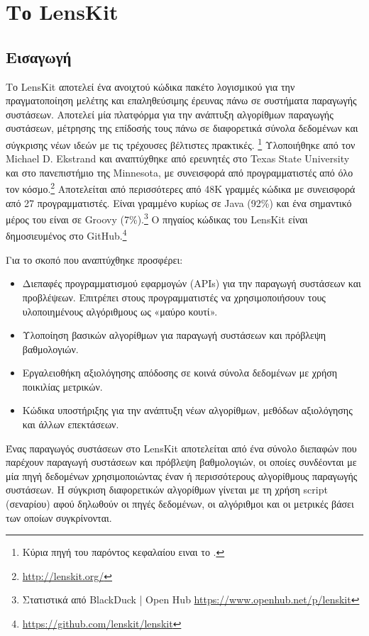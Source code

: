 \chapter{Το {\en LensKit}}
\label{Chapter4}

\section{Εισαγωγή}

Το {\en LensKit} αποτελεί ένα ανοιχτού κώδικα πακέτο λογισμικού για την πραγματοποίηση μελέτης και επαληθεύσιμης έρευνας πάνω σε συστήματα παραγωγής συστάσεων. Αποτελεί μία πλατφόρμα για την ανάπτυξη αλγορίθμων παραγωγής συστάσεων, μέτρησης της επίδοσής τους πάνω σε διαφορετικά σύνολα δεδομένων και σύγκρισης νέων ιδεών με τις τρέχουσες βέλτιστες πρακτικές. \cite{ekstrand_towards_2014}\footnote{Κύρια πηγή του παρόντος κεφαλαίου ειναι το \cite{ekstrand_towards_2014}.} Υλοποιήθηκε από τον {\en Michael D. Ekstrand} και αναπτύχθηκε από ερευνητές στο {\en Texas State University} και στο πανεπιστήμιο της {\en Minnesota}, με συνεισφορά από προγραμματιστές από όλο τον κόσμο.\footnote{\en \url{http://lenskit.org/}} Αποτελείται από περισσότερες από 48Κ γραμμές κώδικα με συνεισφορά από 27 προγραμματιστές. Είναι γραμμένο κυρίως σε {\en Java} (92\%) και ένα σημαντικό μέρος του είναι σε {\en Groovy} (7\%).\footnote{Στατιστικά από \en BlackDuck | Open Hub \url{https://www.openhub.net/p/lenskit}} Ο πηγαίος κώδικας του {\en LensKit} είναι δημοσιευμένος στο {\en GitHub}.\footnote{\en \url{https://github.com/lenskit/lenskit}} \par 
Για το σκοπό που αναπτύχθηκε προσφέρει:
\begin{itemize}
 \item Διεπαφές προγραμματισμού εφαρμογών ({\en APIs}) για την παραγωγή συστάσεων και προβλέψεων. Επιτρέπει στους προγραμματιστές να χρησιμοποιήσουν τους υλοποιημένους αλγόριθμους ως «μαύρο κουτί».
 \item Υλοποίηση βασικών αλγορίθμων για παραγωγή συστάσεων και πρόβλεψη βαθμολογιών. 
 \item Εργαλειοθήκη αξιολόγησης απόδοσης σε κοινά σύνολα δεδομένων με χρήση ποικιλίας μετρικών.
 \item Κώδικα υποστήριξης για την ανάπτυξη νέων αλγορίθμων, μεθόδων αξιολόγησης και άλλων επεκτάσεων.
\end{itemize}
\par Ένας παραγωγός συστάσεων στο {\en LensKit} αποτελείται από ένα σύνολο διεπαφών που παρέχουν παραγωγή συστάσεων και πρόβλεψη βαθμολογιών, οι οποίες συνδέονται με μία πηγή δεδομένων χρησιμοποιώντας έναν ή περισσότερους αλγορίθμους παραγωγής συστάσεων. Η σύγκριση διαφορετικών αλγορίθμων γίνεται με τη χρήση {\en script} (σεναρίου) αφού δηλωθούν οι πηγές δεδομένων, οι αλγόριθμοι και οι μετρικές βάσει των οποίων συγκρίνονται.
